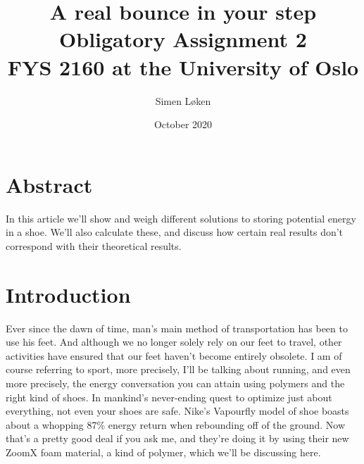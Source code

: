\documentclass{article}
\title{%
A real bounce in your step\\
\large Obligatory Assignment 2 \\
FYS 2160 at the University of Oslo}
\author{Simen Løken}
\date{October 2020}
\begin{document}
\nocite{sourc7}
\nocite{sourc1}
\maketitle
\section{Abstract}
In this article we'll show and weigh different solutions to storing potential energy in a shoe. We'll also calculate these, and discuss how certain real results don't correspond with their theoretical results.
\section{Introduction}
Ever since the dawn of time, man's main method of transportation has been to use his feet. And although we no longer solely rely on our feet to travel, other activities have ensured that our feet haven't become entirely obsolete. I am of course referring to sport, more precisely, I'll be talking about running, and even more precisely, the energy conversation you can attain using polymers and the right kind of shoes. \newline
In mankind's never-ending quest to optimize just about everything, not even your shoes are safe. Nike's Vapourfly model of shoe boasts about a whopping 87\% energy return when rebounding off of the ground. Now that's a pretty good deal if you ask me, and they're doing it by using their new ZoomX foam material, a kind of polymer, which we'll be discussing here.
\end{document}
